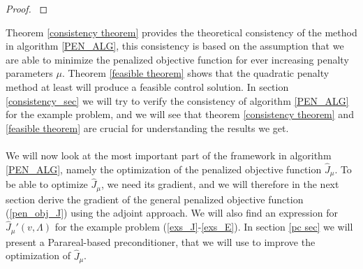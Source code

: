 \begin{proof}
\cite{nocedal2006numerical}
\end{proof}
\noindent
Theorem \ref{consistency theorem} provides the theoretical consistency of the method in algorithm \ref{PEN_ALG}, this consistency is based on the assumption that we are able to minimize the penalized objective function for ever increasing penalty parameters $\mu$. Theorem \ref{feasible theorem} shows that the quadratic penalty method at least will produce a feasible control solution. In section \ref{consistency_sec} we will try to verify the consistency of algorithm \ref{PEN_ALG} for the example problem, and we will see that theorem \ref{consistency theorem} and \ref{feasible theorem} are crucial for understanding the results we get. 
\\
\\
We will now look at the most important part of the framework in algorithm \ref{PEN_ALG}, namely the optimization of the penalized objective function $\hat J_{\mu}$. To be able to optimize $\hat J_{\mu}$, we need its gradient, and we will therefore in the next section derive the gradient of the general penalized objective function (\ref{pen_obj_J}) using the adjoint approach. We will also find an expression for $\hat J_{\mu}'(v,\Lambda)$ for the example problem (\ref{exs_J}-\ref{exs_E}). In section \ref{pc sec} we will present a Parareal-based preconditioner, that we will use to improve the optimization of $\hat J_{\mu}$.
